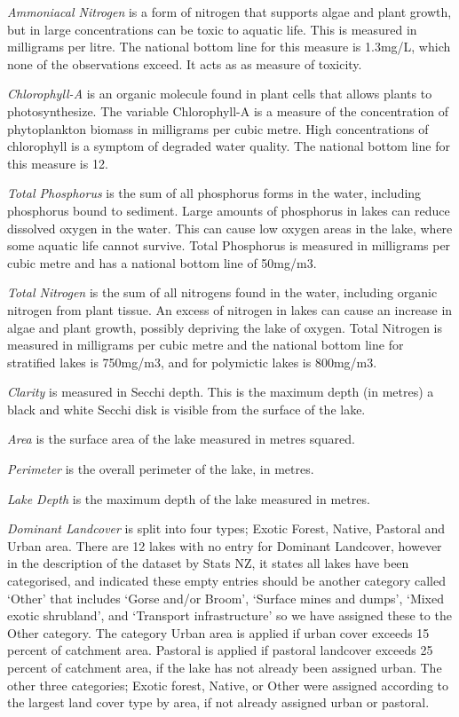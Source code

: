 \documentclass[
]{article}
\begin{document}
\emph{Ammoniacal Nitrogen} is a form of nitrogen that supports algae and plant growth, but in large concentrations can be toxic to aquatic life. This is measured in milligrams per litre. The national bottom line for this measure is 1.3mg/L, which none of the observations exceed. It acts as as measure of toxicity.

\emph{Chlorophyll-A} is an organic molecule found in plant cells that allows plants to photosynthesize. The variable Chlorophyll-A is a measure of the concentration of phytoplankton biomass in milligrams per cubic metre. High concentrations of chlorophyll is a symptom of degraded water quality. The national bottom line for this measure is 12.

\emph{Total Phosphorus} is the sum of all phosphorus forms in the water, including phosphorus bound to sediment. Large amounts of phosphorus in lakes can reduce dissolved oxygen in the water. This can cause low oxygen areas in the lake, where some aquatic life cannot survive. Total Phosphorus is measured in milligrams per cubic metre and has a national bottom line of 50mg/m3.

\emph{Total Nitrogen} is the sum of all nitrogens found in the water, including organic nitrogen from plant tissue. An excess of nitrogen in lakes can cause an increase in algae and plant growth, possibly depriving the lake of oxygen. Total Nitrogen is measured in milligrams per cubic metre and the national bottom line for stratified lakes is 750mg/m3, and for polymictic lakes is 800mg/m3.

\emph{Clarity} is measured in Secchi depth. This is the maximum depth (in metres) a black and white Secchi disk is visible from the surface of the lake.

\emph{Area} is the surface area of the lake measured in metres squared.

\emph{Perimeter} is the overall perimeter of the lake, in metres.

\emph{Lake Depth} is the maximum depth of the lake measured in metres.

\emph{Dominant Landcover} is split into four types; Exotic Forest, Native, Pastoral and Urban area. There are 12 lakes with no entry for Dominant Landcover, however in the description of the dataset by Stats NZ, it states all lakes have been categorised, and indicated these empty entries should be another category called `Other' that includes `Gorse and/or Broom', `Surface mines and dumps', `Mixed exotic shrubland', and `Transport infrastructure' so we have assigned these to the Other category. The category Urban area is applied if urban cover exceeds 15 percent of catchment area. Pastoral is applied if pastoral landcover exceeds 25 percent of catchment area, if the lake has not already been assigned urban. The other three categories; Exotic forest, Native, or Other were assigned according to the largest land cover type by area, if not already assigned urban or pastoral.
\end{document}
